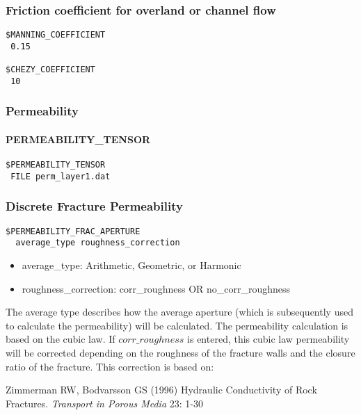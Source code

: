 \subsubsection{Friction coefficient for overland or channel flow}
\begin{verbatim}
$MANNING_COEFFICIENT
 0.15

$CHEZY_COEFFICIENT
 10
\end{verbatim}

\subsubsection{Permeability}
\paragraph*{PERMEABILITY\_TENSOR}
\begin{verbatim}
$PERMEABILITY_TENSOR
 FILE perm_layer1.dat
\end{verbatim}
\subsubsection{Discrete Fracture Permeability}
\begin{verbatim}
$PERMEABILITY_FRAC_APERTURE
  average_type roughness_correction
\end{verbatim}
\begin{itemize}
  \item average\_type: Arithmetic, Geometric, or Harmonic
  \item roughness\_correction: corr\_roughness OR no\_corr\_roughness
\end{itemize}
The average type describes how the average aperture (which is subsequently used to calculate the permeability) will be calculated. The permeability calculation is based on the cubic law. If $corr\_roughness$ is entered, this cubic law permeability will be corrected depending on the roughness of the fracture walls and the closure ratio of the fracture. This correction is based on:

Zimmerman RW, Bodvarsson GS (1996) Hydraulic Conductivity of Rock Fractures.
\emph{Transport in Porous Media} 23: 1-30

